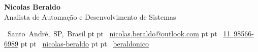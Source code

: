 \begin{header}
	\begin{twocolentry}
		{
			\raggedright
		}
		
		\color{DetailsColor}
		\fontsize{25 pt}{25 pt}\selectfont \textbf{Nicolas Beraldo}\\
		\color{primaryColor}
		\fontsize{13 pt}{13 pt}\selectfont Analista de Automação e Desenvolvimento de Sistemas

		\normalsize
		\mbox{ Santo André, SP, Brasil}
		 pt
		\AND
		 pt
		\mbox{ \href{mailto:nicolas.beraldo@outlook.com}{nicolas.beraldo@outlook.com}}
		 pt
		\AND
		 pt
		\mbox{ \href{tel:11 98566-6989}{11 98566-6989}}
		 pt
		\AND
		 pt
		\mbox{ \href{https://www.linkedin.com/in/nicolas-beraldo}{nicolas-beraldo}}
		 pt
		\AND
		 pt
		\mbox{ \href{https://github.com/beraldonico}{beraldonico}}
	\end{twocolentry}
\end{header}